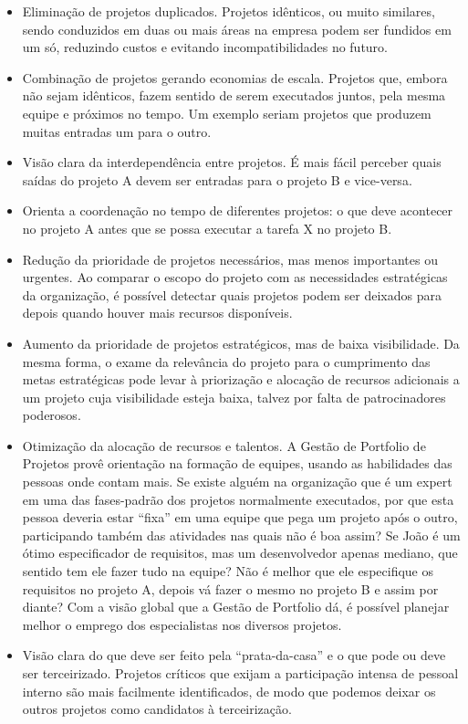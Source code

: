 \documentclass[12pt,a4paper,ruledheader,tocpage=prefix,floatnumber=continuous,pagestart=folhaderosto,font=times]{abnt}
\begin{document}
\begin{itemize}
 \item Eliminação de projetos duplicados. Projetos idênticos, ou muito similares, sendo conduzidos em duas ou mais áreas na empresa podem ser fundidos em um só, reduzindo custos e evitando incompatibilidades no futuro.
 \item Combinação de projetos gerando economias de escala. Projetos que, embora não sejam idênticos, fazem sentido de serem executados juntos, pela mesma equipe e próximos no tempo. Um exemplo seriam projetos que produzem muitas entradas um para o outro.
 \item Visão clara da interdependência entre projetos. É mais fácil perceber quais saídas do projeto A devem ser entradas para o projeto B e vice-versa.
 \item Orienta a coordenação no tempo de diferentes projetos: o que deve acontecer no projeto A antes que se possa executar a tarefa X no projeto B.
 \item Redução da prioridade de projetos necessários, mas menos importantes ou urgentes. Ao comparar o escopo do projeto com as necessidades estratégicas da organização, é possível detectar quais projetos podem ser deixados para depois quando houver mais recursos disponíveis.
 \item Aumento da prioridade de projetos estratégicos, mas de baixa visibilidade. Da mesma forma, o exame da relevância do projeto para o cumprimento das metas estratégicas pode levar à priorização e alocação de recursos adicionais a um projeto cuja visibilidade esteja baixa, 
       talvez por falta de patrocinadores poderosos.
 \item Otimização da alocação de recursos e talentos. A Gestão de Portfolio de Projetos provê orientação na formação de equipes, usando as habilidades das pessoas onde contam mais. Se existe alguém na organização que é um expert em uma das fases-padrão dos projetos normalmente 
executados, por que esta pessoa deveria estar “fixa” em uma equipe que pega um projeto após o outro, participando também das atividades nas quais não é boa assim? Se João é um ótimo especificador de requisitos, mas um desenvolvedor apenas mediano, que sentido tem ele fazer 
tudo na equipe? Não é melhor que ele especifique os requisitos no projeto A, depois vá fazer o mesmo no projeto B e assim por diante? Com a visão global que a Gestão de Portfolio dá, é possível planejar melhor o emprego dos especialistas nos diversos projetos.
 \item Visão clara do que deve ser feito pela “prata-da-casa” e o que pode ou deve ser terceirizado. Projetos críticos que exijam a participação intensa de pessoal interno são mais facilmente identificados, de modo que podemos deixar os outros projetos como candidatos à terceirização.

\end{itemize}
\end{document}
